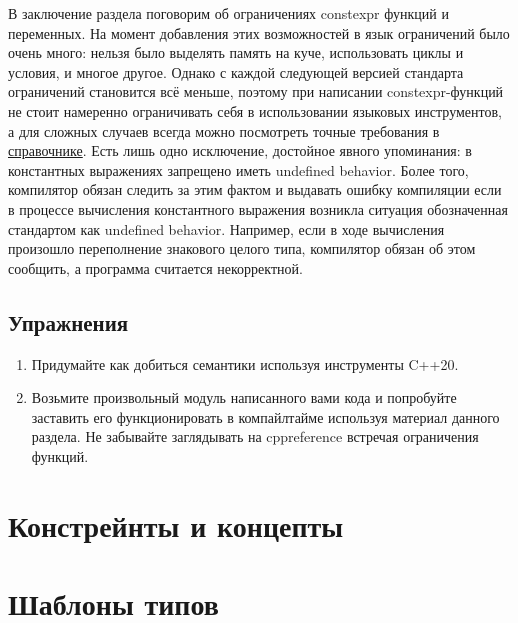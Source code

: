 В заключение раздела поговорим об ограничениях constexpr функций и переменных.
На момент добавления этих возможностей в язык ограничений было очень много: нельзя было выделять память на куче, использовать циклы и условия, и многое другое.
Однако с каждой следующей версией стандарта ограничений становится всё меньше, поэтому при написании constexpr-функций не стоит намеренно ограничивать себя в использовании языковых инструментов, а для сложных случаев всегда можно посмотреть точные требования в \href{https://en.cppreference.com/w/cpp/language/constexpr#:~:text=A%20constexpr%20function%20must%20satisfy%20the%20following%20requirements%3A}{справочнике}.
Есть лишь одно исключение, достойное явного упоминания: в константных выражениях запрещено иметь undefined behavior.
Более того, компилятор обязан следить за этим фактом и выдавать ошибку компиляции если в процессе вычисления константного выражения возникла ситуация обозначенная стандартом как undefined behavior.
Например, если в ходе вычисления произошло переполнение знакового целого типа, компилятор обязан об этом сообщить, а программа считается некорректной.


\subsection*{Упражнения}
\begin{enumerate}
\item Придумайте как добиться семантики  используя инструменты C++20.
\item Возьмите произвольный модуль написанного вами кода и попробуйте заставить его функционировать в компайлтайме используя материал данного раздела.
Не забывайте заглядывать на cppreference встречая ограничения  функций.
\end{enumerate}

\section{Констрейнты и концепты}


\section{Шаблоны типов}
